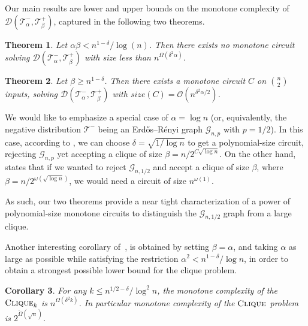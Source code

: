 \documentclass[10pt,a4paper]{article}
\newcommand{\ErdosRenyi}{Erdős–Rényi }
\newtheorem{theorem}{Theorem}[section]
\newtheorem{corollary}[theorem]{Corollary}
\newcommand{\cliquep}{\textsc{Clique}}
\newcommand{\jnote}[1]{\todo[inline,backgroundcolor=blue!20!green]{#1 \\ \textsc{--Jarek}}}
\begin{document}
Our main results are lower and upper bounds on the monotone complexity of $\mathcal{D}(\mathcal{T}^-_\alpha, \mathcal{T}^+_\beta)$, captured in the following two theorems.



\begin{theorem}
\label{thm:main-lb}
    Let $\alpha\beta < n^{1-\delta}/\log(n)$. Then there exists no monotone circuit solving $\mathcal{D}(\mathcal{T}^-_\alpha, \mathcal{T}^+_\beta)$ with size less than $n^{\Omega(\delta^2 \alpha)}$.
\end{theorem}


\begin{theorem}
\label{thm:main-ub}
    Let  $\beta \geq n^{1-\delta}$. Then there exists a monotone circuit $C$ on $\binom{n}{2}$ inputs, solving $\mathcal{D}(\mathcal{T}^-_\alpha, \mathcal{T}^+_\beta)$ with $size(C) = \mathcal{O}(n^{\delta^2\alpha/2})$.
\end{theorem}


We would like to emphasize a special case of $\alpha = \log n$ (or, equivalently, the negative distribution $\mathcal{T}^-$ being an \ErdosRenyi graph $\mathcal{G}_{n,p}$ with $p=1/2$). In this case, according to , we can choose $\delta = \sqrt{1/\log n}$ to get a polynomial-size circuit, rejecting $\mathcal{G}_{n,p}$ yet accepting a clique of size $\beta = n / 2^{C \sqrt{\log n}}$. On the other hand,  states that if we wanted to reject $\mathcal{G}_{n, 1/2}$ and accept a clique of size $\beta$, where $\beta = n / 2^{\omega(\sqrt{\log n})}$, we would need a circuit of size $n^{\omega(1)}$. 

As such, our two theorems provide a near tight characterization of a power of polynomial-size monotone circuits to distinguish the $\mathcal{G}_{n, 1/2}$ graph from a large clique. 

Another interesting corollary of~, is obtained by setting $\beta = \alpha$, and taking $\alpha$ as large as possible while satisfying the restriction $\alpha^2 < n^{1-\delta}/\log n$, in order to obtain a strongest possible lower bound for the clique problem.

\begin{corollary}
    For any $k \leq n^{1/2 - \delta} / \log^2 n$, the monotone complexity of the $\cliquep_k$ is $n^{\Omega(\delta^2 k)}$. In particular monotone complexity of the $\cliquep$ problem is $2^{\tilde{\Omega}(\sqrt{n})}$.
\end{corollary}
\end{document}
